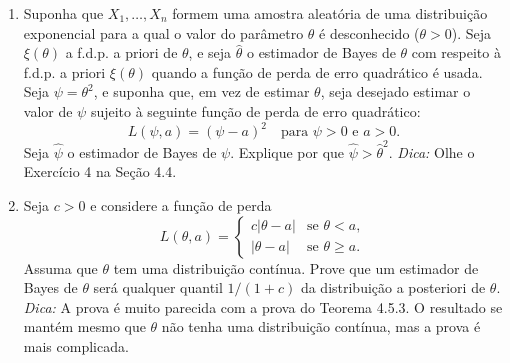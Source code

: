 \begin{enumerate}
    \item Suponha que $X_1, \dots, X_n$ formem uma amostra aleatória de uma distribuição exponencial para a qual o valor do parâmetro $\theta$ é desconhecido ($\theta > 0$). Seja $\xi(\theta)$ a f.d.p. a priori de $\theta$, e seja $\hat{\theta}$ o estimador de Bayes de $\theta$ com respeito à f.d.p. a priori $\xi(\theta)$ quando a função de perda de erro quadrático é usada. Seja $\psi = \theta^2$, e suponha que, em vez de estimar $\theta$, seja desejado estimar o valor de $\psi$ sujeito à seguinte função de perda de erro quadrático:
    $$ L(\psi, a) = (\psi - a)^2 \quad \text{para } \psi > 0 \text{ e } a > 0. $$
    Seja $\hat{\psi}$ o estimador de Bayes de $\psi$. Explique por que $\hat{\psi} > \hat{\theta}^2$. \textit{Dica:} Olhe o Exercício 4 na Seção 4.4.
    
    \item Seja $c>0$ e considere a função de perda
    $$ L(\theta, a) = 
    \begin{cases}
        c|\theta - a| & \text{se } \theta < a, \\
        |\theta - a| & \text{se } \theta \ge a.
    \end{cases}
    $$
    Assuma que $\theta$ tem uma distribuição contínua. Prove que um estimador de Bayes de $\theta$ será qualquer quantil $1/(1+c)$ da distribuição a posteriori de $\theta$. \textit{Dica:} A prova é muito parecida com a prova do Teorema 4.5.3. O resultado se mantém mesmo que $\theta$ não tenha uma distribuição contínua, mas a prova é mais complicada.
    
\end{enumerate}